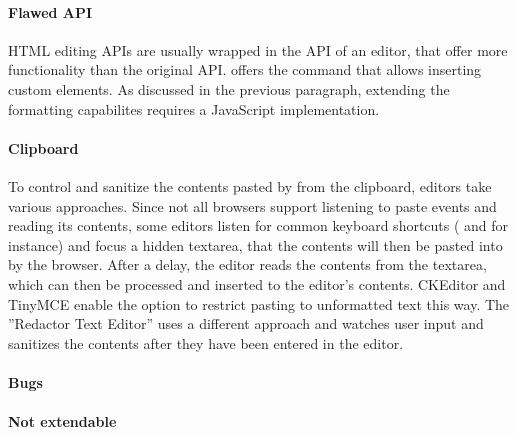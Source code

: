 \paragraph{Flawed API} HTML editing APIs are usually wrapped in the API of an editor, that offer more functionality than the original API.  offers the  command that allows inserting custom elements. As discussed in the previous paragraph, extending the formatting capabilites requires a JavaScript implementation.

\paragraph{Clipboard} To control and sanitize the contents pasted by from the clipboard, editors take various approaches. Since not all browsers support listening to paste events and reading its contents, some editors listen for common keyboard shortcuts ( and  for instance) and focus a hidden textarea, that the contents will then be pasted into by the browser. After a delay, the editor reads the contents from the textarea, which can then be processed and inserted to the editor's contents. CKEditor and TinyMCE enable the option to restrict pasting to unformatted text this way. The ''Redactor Text Editor'' uses a different approach and watches user input and sanitizes the contents after they have been entered in the editor.





\paragraph{Bugs}
\paragraph{Not extendable}



